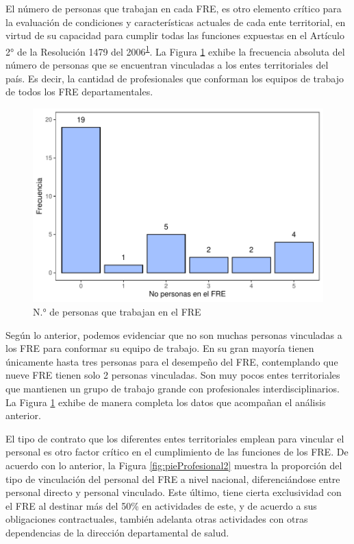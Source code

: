 \documentclass[
]{book}
\begin{document}
El número de personas que trabajan en cada FRE, es otro elemento crítico para la evaluación de condiciones y características actuales de cada ente territorial, en virtud de su capacidad para cumplir todas las funciones expuestas en el Artículo 2° de la Resolución 1479 del 2006\textsuperscript{\protect\hyperlink{ref-MSPS1479-2006}{1}}. La Figura \ref{fig:perfilProfesional3} exhibe la frecuencia absoluta del número de personas que se encuentran vinculadas a los entes territoriales del país. Es decir, la cantidad de profesionales que conforman los equipos de trabajo de todos los FRE departamentales.

\begin{figure}

{\centering \includegraphics[width=1\linewidth]{InformeFinal_files/figure-latex/perfilProfesional3-1} 

}

\caption{N.° de personas que trabajan en el FRE}\label{fig:perfilProfesional3}
\end{figure}

Según lo anterior, podemos evidenciar que no son muchas personas vinculadas a los FRE para conformar su equipo de trabajo. En su gran mayoría tienen únicamente hasta tres personas para el desempeño del FRE, contemplando que nueve FRE tienen solo 2 personas vinculadas. Son muy pocos entes territoriales que mantienen un grupo de trabajo grande con profesionales interdisciplinarios. La Figura \ref{fig:perfilProfesional3} exhibe de manera completa los datos que acompañan el análisis anterior.

El tipo de contrato que los diferentes entes territoriales emplean para vincular el personal es otro factor crítico en el cumplimiento de las funciones de los FRE. De acuerdo con lo anterior, la Figura \ref{fig:pieProfesional2} muestra la proporción del tipo de vinculación del personal del FRE a nivel nacional, diferenciándose entre personal directo y personal vinculado. Este último, tiene cierta exclusividad con el FRE al destinar más del 50\% en actividades de este, y de acuerdo a sus obligaciones contractuales, también adelanta otras actividades con otras dependencias de la dirección departamental de salud.
\end{document}
